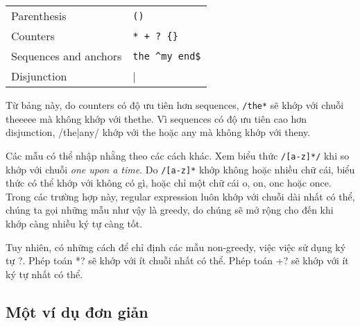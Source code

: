 \begin{center}
\begin{tabular}{ l l }
	 Parenthesis & \verb|()| \\
	 Counters  & \verb|* + ? {}| \\
	 Sequences and anchors & \verb|the ^my end$| \\
	 Disjunction & \verb||| \\
\end{tabular}
\end{center}

Từ bảng này, do counters có độ ưu tiên hơn sequences, \verb|/the*| sẽ khớp với chuỗi theeeee mà không khớp với thethe. Vì sequences có độ ưu tiên cao hơn disjunction, /the|any/ khớp với the hoặc any mà không khớp với theny.

Các mẫu có thể nhập nhằng theo các cách khác. Xem biểu thức \verb|/[a-z]*/| khi so khớp với chuỗi \textit{one upon a time}. Do \verb|/[a-z]*| khớp không hoặc nhiều chữ cái, biểu thức có thể khớp với không có gì, hoặc chỉ một chữ cái o, on, onc hoặc once. Trong các trường hợp này, regular expression luôn khớp với chuỗi dài nhất có thể, chúng ta gọi những mẫu như vậy là greedy, do chúng sẽ mở rộng cho đến khi khớp càng nhiều ký tự càng tốt.

Tuy nhiên, có những cách để chỉ định các mẫu non-greedy, việc việc sử dụng ký tự ?. Phép toán *? sẽ khớp với ít chuỗi nhất có thể. Phép toán +? sẽ khớp với ít ký tự nhất có thể.

\subsection{Một ví dụ đơn giản}
